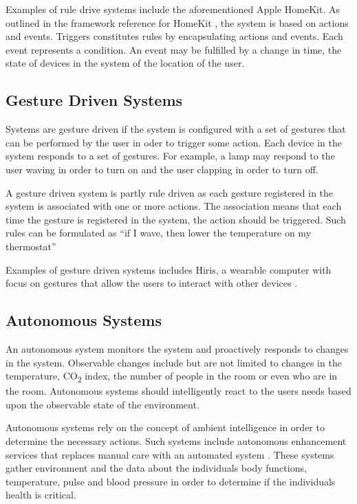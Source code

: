 Examples of rule drive systems include the aforementioned Apple HomeKit. 
As outlined in the framework reference for HomeKit \cite{applehomekitref}, the system is based on actions and events. 
Triggers constitutes rules by encapsulating actions and events. 
Each event represents a condition. 
An event may be fulfilled by a change in time, the state of devices in the system of the location of the user.

\subsection{Gesture Driven Systems}

Systems are gesture driven if the system is configured with a set of gestures that can be performed by the user in oder to trigger some action. 
Each device in the system responds to a set of gestures. 
For example, a lamp may respond to the user waving in order to turn on and the user clapping in order to turn off.

A gesture driven system is partly rule driven as each gesture registered in the system is associated with one or more actions. 
The association means that each time the gesture is registered in the system, the action should be triggered. 
Such rules can be formulated as ``if I wave, then lower the temperature on my thermostat''

Examples of gesture driven systems includes Hiris, a wearable computer with focus on gestures that allow the users to interact with other devices \cite{hirisweb}.

\subsection{Autonomous Systems}

An autonomous system monitors the system and proactively responds to changes in the system. 
Observable changes include but are not limited to changes in the temperature, CO\textsubscript{2} index, the number of people in the room or even who are in the room.
Autonomous systems should intelligently react to the users needs based upon the observable state of the environment.

Autonomous systems rely on the concept of ambient intelligence in order to determine the necessary actions.
Such systems include autonomous enhancement services that replaces manual care with an automated system \cite{nehmer2006living}. 
These systems gather environment and the data about the individuals body functions, 
\eg temperature, pulse and blood pressure in order to determine if the individuals health is critical.

